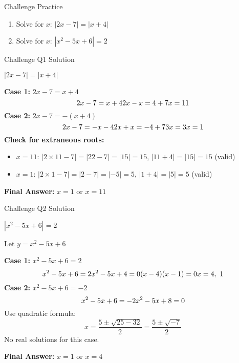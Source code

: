 \documentclass[aspectratio=169]{beamer}
\begin{document}

\begin{frame}{Challenge Practice}
    \begin{tcolorbox}[colback=lightgray,colframe=accent,title=Challenge Problems]
        \footnotesize
        \begin{enumerate}
            \item[Q1.] Solve for $x$: $|2x-7| = |x+4|$
            \item[Q2.] Solve for $x$: $|x^2-5x+6| = 2$
        \end{enumerate}
    \end{tcolorbox}
\end{frame}

\begin{frame}{Challenge Q1 Solution}
    \begin{tcolorbox}[colback=lightgray,colframe=primary,title=Solution to Q1]
        \footnotesize
        $|2x-7| = |x+4|$
        
        \textbf{Case 1:} $2x-7 = x+4$
        \[
        2x-7 = x+4 \\
        2x-x = 4+7 \\
        x = 11
        \]
        \textbf{Case 2:} $2x-7 = -(x+4)$
        \[
        2x-7 = -x-4 \\
        2x+x = -4+7 \\
        3x = 3 \\
        x = 1
        \]
        \textbf{Check for extraneous roots:}
        \begin{itemize}
            \item $x=11$: $|2\times11-7|=|22-7|=|15|=15$, $|11+4|=|15|=15$ (valid)
            \item $x=1$: $|2\times1-7|=|2-7|=|-5|=5$, $|1+4|=|5|=5$ (valid)
        \end{itemize}
        \textbf{Final Answer:} $x=1$ or $x=11$
    \end{tcolorbox}
\end{frame}

\begin{frame}{Challenge Q2 Solution}
    \begin{tcolorbox}[colback=lightgray,colframe=primary,title=Solution to Q2]
        \footnotesize
        $|x^2-5x+6| = 2$
        
        Let $y = x^2-5x+6$
        
        \textbf{Case 1:} $x^2-5x+6 = 2$
        \[
        x^2-5x+6=2 \\
        x^2-5x+4=0 \\
        (x-4)(x-1)=0 \\
        x=4,\ 1
        \]
        \textbf{Case 2:} $x^2-5x+6 = -2$
        \[
        x^2-5x+6=-2 \\
        x^2-5x+8=0
        \]
        Use quadratic formula:
        \[
        x=\frac{5\pm\sqrt{25-32}}{2}=\frac{5\pm\sqrt{-7}}{2}
        \]
        No real solutions for this case.
        
        \textbf{Final Answer:} $x=1$ or $x=4$
    \end{tcolorbox}
\end{frame}
\end{document}
